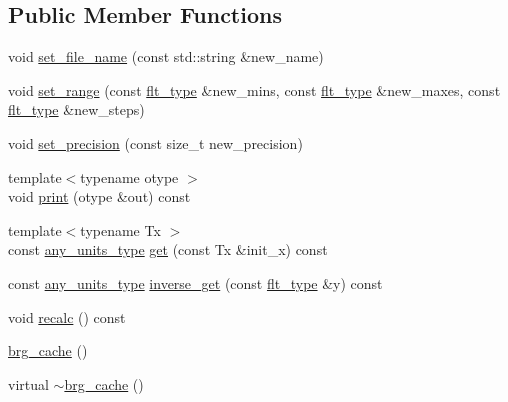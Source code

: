 \subsection*{Public Member Functions}
\begin{DoxyCompactItemize}
\item 
void \hyperlink{classIceBRG_1_1brg__cache_a319322b7933cebb56a0efaafde8e8530}{set\+\_\+file\+\_\+name} (const std\+::string \&new\+\_\+name)
\item 
void \hyperlink{classIceBRG_1_1brg__cache_a16bfd53b9b2c67d5797176c62c7d36d1}{set\+\_\+range} (const \hyperlink{lib_2IceBRG__main_2common_8h_ad0f130a56eeb944d9ef2692ee881ecc4}{flt\+\_\+type} \&new\+\_\+mins, const \hyperlink{lib_2IceBRG__main_2common_8h_ad0f130a56eeb944d9ef2692ee881ecc4}{flt\+\_\+type} \&new\+\_\+maxes, const \hyperlink{lib_2IceBRG__main_2common_8h_ad0f130a56eeb944d9ef2692ee881ecc4}{flt\+\_\+type} \&new\+\_\+steps)
\item 
void \hyperlink{classIceBRG_1_1brg__cache_a9ffe4a3efac6a30761f78feb453a3644}{set\+\_\+precision} (const size\+\_\+t new\+\_\+precision)
\item 
{\footnotesize template$<$typename otype $>$ }\\void \hyperlink{classIceBRG_1_1brg__cache_a203d556e29e1f277809ec09e89b22439}{print} (otype \&out) const 
\item 
{\footnotesize template$<$typename Tx $>$ }\\const \hyperlink{namespaceIceBRG_a3101fc159e191fa99c4ec14e445df96e}{any\+\_\+units\+\_\+type} \hyperlink{classIceBRG_1_1brg__cache_a8be8ab65cdb161de7145649eb86e60f5}{get} (const Tx \&init\+\_\+x) const 
\item 
const \hyperlink{namespaceIceBRG_a3101fc159e191fa99c4ec14e445df96e}{any\+\_\+units\+\_\+type} \hyperlink{classIceBRG_1_1brg__cache_af011fa69aeebc51a28fbea40de9212ec}{inverse\+\_\+get} (const \hyperlink{lib_2IceBRG__main_2common_8h_ad0f130a56eeb944d9ef2692ee881ecc4}{flt\+\_\+type} \&y) const 
\item 
void \hyperlink{classIceBRG_1_1brg__cache_a45ca108f1964da3f821cc8d36fe1153f}{recalc} () const 
\item 
\hyperlink{classIceBRG_1_1brg__cache_ac365e93dd0b7c3b91125c4dff3530f49}{brg\+\_\+cache} ()
\item 
virtual \hyperlink{classIceBRG_1_1brg__cache_ab4556e59993e9c60c5937fbece2248b4}{$\sim$brg\+\_\+cache} ()
\end{DoxyCompactItemize}
